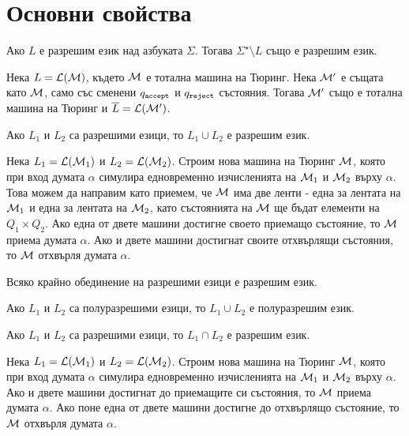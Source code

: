 \section{Основни свойства}

\begin{prop}
  Ако $L$ е разрешим език над азбуката $\Sigma$.
  Тогава $\Sigma^\star \setminus L$ също е разрешим език.
\end{prop}
\begin{hint}
  Нека $L = \mathcal{L}(\mathcal{M})$, където $\mathcal{M}$ е тотална машина на Тюринг.
  Нека $\mathcal{M}'$ е същата като $\mathcal{M}$, само със сменени $q_{\texttt{accept}}$ и $q_{\texttt{reject}}$ състояния.
  Тогава $\mathcal{M}'$ също е тотална машина на Тюринг и $\overline{L} = \mathcal{L}(\mathcal{M}')$.
\end{hint}

\begin{prop}
  Ако $L_1$ и $L_2$ са разрешими езици, то $L_1 \cup L_2$ е разрешим език.
\end{prop}
\begin{hint}
  Нека $L_1 = \mathcal{L}(\mathcal{M}_1)$ и $L_2 = \mathcal{L}(\mathcal{M}_2)$.
  Строим нова машина на Тюринг $\mathcal{M}$, която при вход думата $\alpha$
  симулира едновременно изчисленията на $\mathcal{M}_1$ и $\mathcal{M}_2$ върху $\alpha$.
  Това можем да направим като приемем, че $\mathcal{M}$ има две ленти - една за лентата на $\mathcal{M}_1$ и една за лентата на $\mathcal{M}_2$,
  като състоянията на $\mathcal{M}$ ще бъдат елементи на $Q_1 \times Q_2$.
  Ако една от двете машини достигне своето приемащо състояние, то $\mathcal{M}$ приема думата $\alpha$.
  Ако и двете машини достигнат своите отхвърлящи състояния, то $\mathcal{M}$ отхвърля думата $\alpha$.
\end{hint}

\begin{cor}
  Всяко крайно обединение на разрешими езици е разрешим език.
\end{cor}

\begin{prop}
  Ако $L_1$ и $L_2$ са полуразрешими езици, то $L_1 \cup L_2$ е полуразрешим език.
\end{prop}

\begin{prop}
  Ако $L_1$ и $L_2$ са разрешими езици, то $L_1 \cap L_2$ е разрешим език.
\end{prop}
\begin{hint}
  Нека $L_1 = \mathcal{L}(\mathcal{M}_1)$ и $L_2 = \mathcal{L}(\mathcal{M}_2)$.
  Строим нова машина на Тюринг $\mathcal{M}$, която при вход думата $\alpha$
  симулира едновременно изчисленията на $\mathcal{M}_1$ и $\mathcal{M}_2$ върху $\alpha$.
  Ако и двете машини достигнат до приемащите си състояния, то $\mathcal{M}$ приема думата $\alpha$.
  Ако поне една от двете машини достигне до отхвърлящо състояние, то $\mathcal{M}$ отхвърля думата $\alpha$.
\end{hint}

